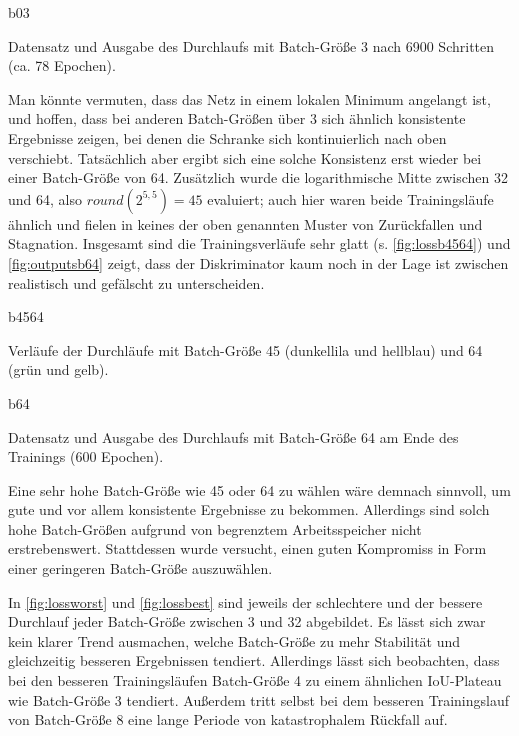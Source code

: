 \begin{outputs}{b03}
	\caption{Datensatz und Ausgabe des Durchlaufs mit Batch-Größe 3 nach 6900 Schritten (ca. 78 Epochen).}
	\label{fig:outputsb03}
\end{outputs}

Man könnte vermuten, dass das Netz in einem lokalen Minimum angelangt ist, und hoffen, dass bei anderen Batch-Größen über 3 sich ähnlich konsistente Ergebnisse zeigen, bei denen die Schranke sich kontinuierlich nach oben verschiebt.
Tatsächlich aber ergibt sich eine solche Konsistenz erst wieder bei einer Batch-Größe von 64.
Zusätzlich wurde die logarithmische Mitte zwischen 32 und 64, also $ round(2^{5,5}) = 45 $ evaluiert; auch hier waren beide Trainingsläufe ähnlich und fielen in keines der oben genannten Muster von Zurückfallen und Stagnation.
Insgesamt sind die Trainingsverläufe sehr glatt (s. \autoref{fig:lossb4564}) und \autoref{fig:outputsb64} zeigt, dass der Diskriminator kaum noch in der Lage ist zwischen realistisch und gefälscht zu unterscheiden.

\begin{losses}{b4564}
	\caption{Verläufe der Durchläufe mit Batch-Größe 45 (dunkellila und hellblau) und 64 (grün und gelb).}
	\label{fig:lossb4564}
\end{losses}

\begin{outputs}{b64}
	\caption{Datensatz und Ausgabe des Durchlaufs mit Batch-Größe 64 am Ende des Trainings (600 Epochen).}
	\label{fig:outputsb64}
\end{outputs}

Eine sehr hohe Batch-Größe wie 45 oder 64 zu wählen wäre demnach sinnvoll, um gute und vor allem konsistente Ergebnisse zu bekommen.
Allerdings sind solch hohe Batch-Größen aufgrund von begrenztem Arbeitsspeicher nicht erstrebenswert.
Stattdessen wurde versucht, einen guten Kompromiss in Form einer geringeren Batch-Größe auszuwählen.

In \autoref{fig:lossworst} und \autoref{fig:lossbest} sind jeweils der schlechtere und der bessere Durchlauf jeder Batch-Größe zwischen 3 und 32 abgebildet.
Es lässt sich zwar kein klarer Trend ausmachen, welche Batch-Größe zu mehr Stabilität und gleichzeitig besseren Ergebnissen tendiert.
Allerdings lässt sich beobachten, dass bei den besseren Trainingsläufen Batch-Größe 4 zu einem ähnlichen IoU-Plateau wie Batch-Größe 3 tendiert.
Außerdem tritt selbst bei dem besseren Trainingslauf von Batch-Größe 8 eine lange Periode von katastrophalem Rückfall auf.

